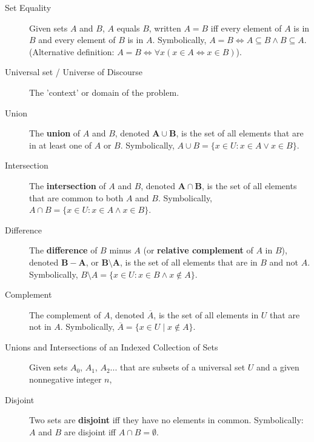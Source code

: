 \documentclass{article}
\begin{document}
\begin{description}
    \item[Set Equality]Given sets $A$ and $B$, $A$ equals $B$, written $A=B$ iff every element of $A$ is in $B$ and every element of $B$ is in $A$. Symbolically, $A=B\Leftrightarrow A\subseteq B\land B\subseteq A$. (Alternative definition: $A=B \Leftrightarrow\forall x(x\in A\Leftrightarrow x\in B)$).
    \item[Universal set / Universe of Discourse] The 'context' or domain of the problem.
    \item[Union] The \textbf{union} of $A$ and $B$, denoted $\mathbf{A}\cup\mathbf{B}$, is the set of all elements that are in at least one of $A$ or $B$. Symbolically, $A\cup B=\{x\in U: x\in A \lor x\in B\}$.
    \item[Intersection] The \textbf{intersection} of $A$ and $B$, denoted $\mathbf{A}\cap\mathbf{B}$, is the set of all elements that are common to both $A$ and $B$. Symbolically, $A\cap B=\{x\in U:x\in A \land x\in B\}$.
    \item[Difference]The \textbf{difference} of $B$ minus $A$ (or \textbf{relative complement} of $A$ in $B$), denoted $\mathbf{B}-\mathbf{A}$, or $\mathbf{B}\setminus\mathbf{A}$, is the set of all elements that are in $B$ and not $A$. Symbolically, $B\setminus A=\{x\in U:x\in B\land x\not\in A\}$.
    \item[Complement]The complement of $A$, denoted $\overline{A}$, is the set of all elements in $U$ that are not in $A$. Symbolically, $\overline{A}=\{x\in U\;|\;x\not\in A\}$.
    \item[Unions and Intersections of an Indexed Collection of Sets] Given sets $A_{0}$, $A_{1}$, $A_{2}$... that are subsets of a universal set $U$ and a given nonnegative integer $n$, 
    \begin{description}
    	\item \[\bigcup_{i=0}^{n} A_{i}=\{x\in U\;|\;x\in A_{i} \text{ for at least one }i=0,1,2,\dots,n \}\]
		\item \[\bigcup_{i=0}^{\infty}A_{i}=\{x\in U\; |\;x\in A_{i} \text{ for at least one nonnegative integer }i\}  \]
		\item \[\bigcap_{i=0}^{n}A_{i}=\{x\in U\;|\;x\in A_{i} \text{ for all }i=0,1,2,\dots,n\}\]
		\item \[\bigcap_{i=0}^{\infty}A_{i}=\{x\in U\;|\;x\in A_{i} \text{ for all nonnegative integers }i\}\]
    \end{description}
    \vspace{0.1cm}
    \item[Disjoint]Two sets are \textbf{disjoint} iff they have no elements in common. Symbolically: $A$ and $B$ are disjoint iff $A\cap B=\emptyset$.

\end{description}
\end{document}
